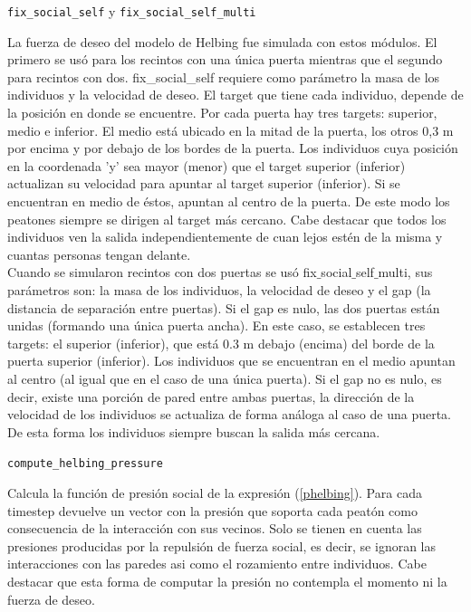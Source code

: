 {\Large {\tt fix\_social\_self} y {\tt fix\_social\_self\_multi}}

La fuerza de deseo del modelo de Helbing fue simulada con estos módulos. El primero se usó para los recintos con una única puerta mientras que el segundo para recintos con dos. 
fix\_social\_self requiere como parámetro la masa de los individuos y la velocidad de deseo. El target que tiene cada individuo, depende de la posición en donde se encuentre. Por cada puerta hay tres targets: superior, medio e inferior. El medio está ubicado en la mitad de la puerta, los otros 0,3 m por encima y por debajo de los bordes de la puerta.  Los individuos cuya posición en la coordenada 'y' sea mayor (menor) que el target superior (inferior) actualizan su velocidad para apuntar al target superior (inferior). Si se encuentran en medio de éstos, apuntan al centro de la puerta. De este modo los peatones siempre se dirigen al target más cercano. Cabe destacar que todos los individuos ven la salida independientemente de cuan lejos estén de la misma y cuantas personas tengan delante.\\  

Cuando se simularon recintos con dos puertas se usó fix$\_$social$\_$self$\_$multi, sus parámetros son: la masa de los individuos, la velocidad de deseo y el gap (la distancia de separación entre puertas). Si el gap es nulo, las dos puertas están unidas (formando una única puerta ancha). En este caso, se establecen tres targets: el superior (inferior), que está 0.3 m debajo (encima) del borde de la puerta superior (inferior). Los individuos que se encuentran en el medio apuntan al centro (al igual que en el caso de una única puerta).
Si el gap no es nulo, es decir, existe una porción de pared entre ambas puertas, la dirección de la velocidad de los individuos se actualiza de forma análoga al caso de una puerta. De esta forma los individuos siempre buscan la salida más cercana. 

{\Large {\tt compute\_helbing\_pressure}}

Calcula la función de presión social de la expresión (\ref{phelbing}). Para cada timestep devuelve un vector con la presión que soporta cada peatón como consecuencia de la interacción con sus vecinos. Solo se tienen en cuenta las presiones producidas por la repulsión de fuerza social, es decir, se ignoran las interacciones con las paredes asi como el rozamiento entre individuos. Cabe destacar que esta forma de computar la presión no contempla el momento ni la fuerza de deseo.

